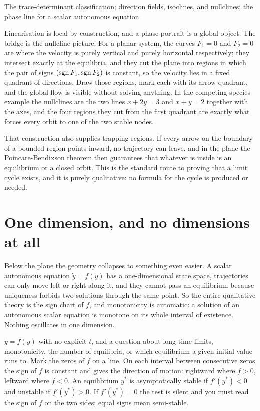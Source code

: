 \begin{seealsob}The trace-determinant classification; direction fields, isoclines, and nullclines; the phase line for a scalar autonomous equation.\end{seealsob}

Linearisation is local by construction, and a phase portrait is a global object. The bridge is the nullcline picture. For a planar system, the curves $F_1=0$ and $F_2=0$ are where the velocity is purely vertical and purely horizontal respectively; they intersect exactly at the equilibria, and they cut the plane into regions in which the pair of signs $(\operatorname{sgn} F_1,\operatorname{sgn} F_2)$ is constant, so the velocity lies in a fixed quadrant of directions. Draw those regions, mark each with its arrow quadrant, and the global flow is visible without solving anything. In the competing-species example the nullclines are the two lines $x+2y=3$ and $x+y=2$ together with the axes, and the four regions they cut from the first quadrant are exactly what forces every orbit to one of the two stable nodes.

That construction also supplies trapping regions. If every arrow on the boundary of a bounded region points inward, no trajectory can leave, and in the plane the Poincare-Bendixson theorem then guarantees that whatever is inside is an equilibrium or a closed orbit. This is the standard route to proving that a limit cycle exists, and it is purely qualitative: no formula for the cycle is produced or needed.

\section{One dimension, and no dimensions at all}

Below the plane the geometry collapses to something even easier. A scalar autonomous equation $\dot y=f(y)$ has a one-dimensional state space, trajectories can only move left or right along it, and they cannot pass an equilibrium because uniqueness forbids two solutions through the same point. So the entire qualitative theory is the sign chart of $f$, and monotonicity is automatic: a solution of an autonomous scalar equation is monotone on its whole interval of existence. Nothing oscillates in one dimension.

\cue $\dot y=f(y)$ with no explicit $t$, and a question about long-time limits, monotonicity, the number of equilibria, or which equilibrium a given initial value runs to.
\method Mark the zeros of $f$ on a line. On each interval between consecutive zeros the sign of $f$ is constant and gives the direction of motion: rightward where $f>0$, leftward where $f<0$. An equilibrium $y^{*}$ is asymptotically stable if $f'(y^{*})<0$ and unstable if $f'(y^{*})>0$. If $f'(y^{*})=0$ the test is silent and you must read the sign of $f$ on the two sides; equal signs mean semi-stable.

